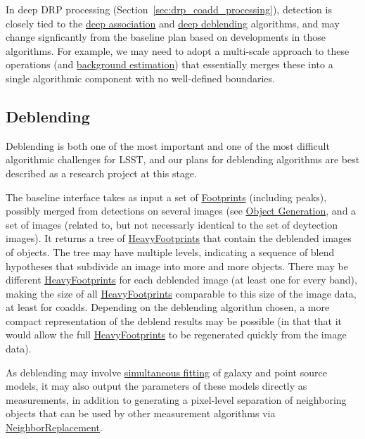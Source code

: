 In deep DRP processing (Section~\ref{sec:drp_coadd_processing}), detection is closely tied to the \hyperref[drpDeepAssociate]{deep association} and \hyperref[drpDeepDeblend]{deep deblending} algorithms, and may change signficantly from the baseline plan based on developments in those algorithms.  For example, we may need to adopt a multi-scale approach to these operations (and \hyperref[sec:drpCoaddBackgroundEstimation]{background estimation}) that essentially merges these into a single algorithmic component with no well-defined boundaries.


\subsection{Deblending}
\label{sec:acDeblending}

Deblending is both one of the most important and one of the most difficult algorithmic challenges for LSST, and our plans for deblending algorithms are best described as a research project at this stage.

The baseline interface takes as input a set of \hyperref[sec:spFootprints]{Footprints} (including peaks), possibly merged from detections on several images (see \hyperref[sec:acObjectGeneration]{Object Generation}, and a set of images (related to, but not necessarly identical to the set of deytection images).  It returns a tree of \hyperref[sec:spFootprintsHeavy]{HeavyFootprints} that contain the deblended images of objects.  The tree may have multiple levels, indicating a sequence of blend hypotheses that subdivide an image into more and more objects.  There may be different \hyperref[sec:spFootprintsHeavy]{HeavyFootprints} for each deblended image (at least one for every band), making the size of all \hyperref[sec:spFootprintsHeavy]{HeavyFootprints} comparable to this size of the image data, at least for coadds.  Depending on the deblending algorithm chosen, a more compact representation of the deblend results may be possible (in that that it would allow the full \hyperref[sec:spFootprintsHeavy]{HeavyFootprints} to be regenerated quickly from the image data).

As deblending may involve \hyperref[sec:acSimultaneousFitting]{simultaneous fitting} of galaxy and point source models, it may also output the parameters of these models directly as measurements, in addition to generating a pixel-level separation of neighboring objects that can be used by other measurement algorithms via \hyperref[sec:acNeighborReplacement]{NeighborReplacement}.

